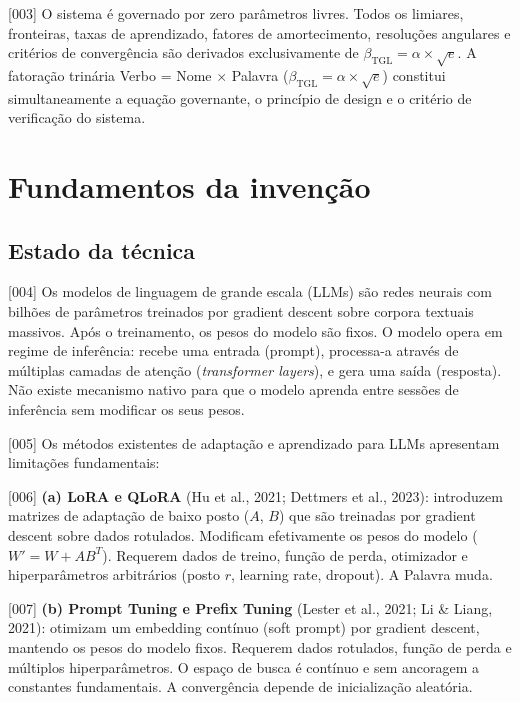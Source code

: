 \documentclass[12pt,a4paper]{article}
\newcommand{\betatgl}{\beta_{\text{TGL}}}
\begin{document}
{[003]} O sistema é governado por zero parâmetros livres. Todos os limiares, fronteiras, taxas de aprendizado, fatores de amortecimento, resoluções angulares e critérios de convergência são derivados exclusivamente de $\betatgl = \alpha \times \sqrt{e}$. A fatoração trinária Verbo = Nome $\times$ Palavra ($\betatgl = \alpha \times \sqrt{e}$) constitui simultaneamente a equação governante, o princípio de design e o critério de verificação do sistema.

\section{Fundamentos da invenção}

\subsection{Estado da técnica}

{[004]} Os modelos de linguagem de grande escala (LLMs) são redes neurais com bilhões de parâmetros treinados por gradient descent sobre corpora textuais massivos. Após o treinamento, os pesos do modelo são fixos. O modelo opera em regime de inferência: recebe uma entrada (prompt), processa-a através de múltiplas camadas de atenção (\textit{transformer layers}), e gera uma saída (resposta). Não existe mecanismo nativo para que o modelo aprenda entre sessões de inferência sem modificar os seus pesos.

{[005]} Os métodos existentes de adaptação e aprendizado para LLMs apresentam limitações fundamentais:

{[006]} \textbf{(a) LoRA e QLoRA} (Hu et al., 2021; Dettmers et al., 2023): introduzem matrizes de adaptação de baixo posto ($A$, $B$) que são treinadas por gradient descent sobre dados rotulados. Modificam efetivamente os pesos do modelo ($W' = W + AB^T$). Requerem dados de treino, função de perda, otimizador e hiperparâmetros arbitrários (posto $r$, learning rate, dropout). A Palavra muda.

{[007]} \textbf{(b) Prompt Tuning e Prefix Tuning} (Lester et al., 2021; Li \& Liang, 2021): otimizam um embedding contínuo (soft prompt) por gradient descent, mantendo os pesos do modelo fixos. Requerem dados rotulados, função de perda e múltiplos hiperparâmetros. O espaço de busca é contínuo e sem ancoragem a constantes fundamentais. A convergência depende de inicialização aleatória.
\end{document}
